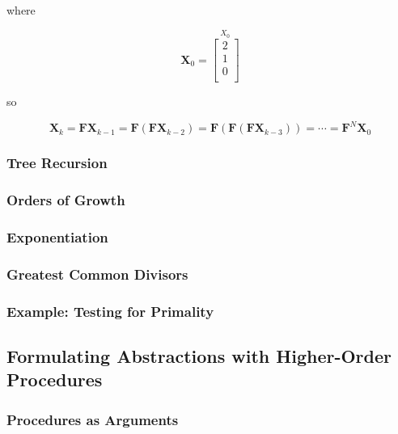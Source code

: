 where

\begin{equation}
\mathbf{X}_0 = 
\stackrel{\mbox{$X_{0}$}}{
\left[ \begin{array}{c}
2 \\
1 \\
0 \\
\end{array} \right]
}
\label{eq:ss_x0}
\end{equation}

so

\begin{equation}
\mathbf{X}_k 
= \mathbf{F}\mathbf{X}_{k-1}
= \mathbf{F} \left( \mathbf{F}\mathbf{X}_{k-2} \right)
= \mathbf{F} \left( \mathbf{F} \left( \mathbf{F}\mathbf{X}_{k-3} \right) \right)
= \cdots
= \mathbf{F}^N \mathbf{X}_0
\label{eq:ss_rep_expanded}
\end{equation}

            \subsubsection{Tree Recursion}
            \subsubsection{Orders of Growth}
            \subsubsection{Exponentiation}
            \subsubsection{Greatest Common Divisors}
            \subsubsection{Example: Testing for Primality}
        \subsection{Formulating Abstractions with Higher-Order Procedures}
            \subsubsection{Procedures as Arguments}
